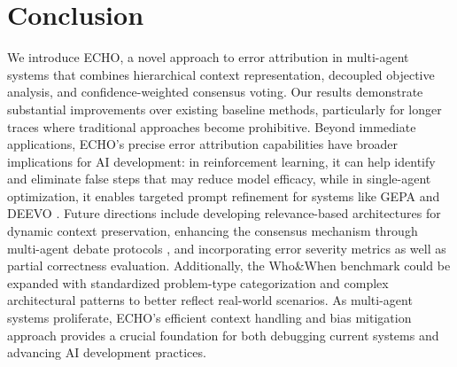\documentclass{article}
\begin{document}
\section{Conclusion}

We introduce ECHO, a novel approach to error attribution in multi-agent systems that combines hierarchical context representation, decoupled objective analysis, and confidence-weighted consensus voting. Our results demonstrate substantial improvements over existing baseline methods, particularly for longer traces where traditional approaches become prohibitive. Beyond immediate applications, ECHO's precise error attribution capabilities have broader implications for AI development: in reinforcement learning, it can help identify and eliminate false steps that may reduce model efficacy, while in single-agent optimization, it enables targeted prompt refinement for systems like GEPA \cite{agrawal2025gepareflectivepromptevolution} and DEEVO \cite{nair2025tournamentpromptsevolvingllm}. Future directions include developing relevance-based architectures for dynamic context preservation, enhancing the consensus mechanism through multi-agent debate protocols \cite{nair2025tournamentpromptsevolvingllm}, and incorporating error severity metrics as well as partial correctness evaluation. Additionally, the Who\&When benchmark could be expanded with standardized problem-type categorization and complex architectural patterns to better reflect real-world scenarios. As multi-agent systems proliferate, ECHO's efficient context handling and bias mitigation approach provides a crucial foundation for both debugging current systems and advancing AI development practices.
\end{document}
